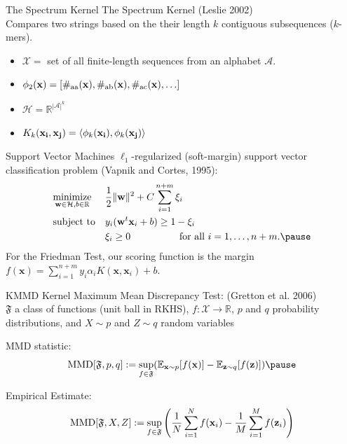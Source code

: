 \documentclass{beamer}
\providecommand{\norm}[1]{\lVert#1\rVert}
\begin{document}
\begin{frame}{The Spectrum Kernel}
  The Spectrum Kernel (Leslie 2002) \\ \pause
  Compares two strings based on the their length $k$ contiguous
  subsequences ($k$-mers). \pause
  \begin{itemize}
    \item $\mathcal{X} = $ set of all finite-length sequences from an alphabet $\mathcal{A}$. \pause
    \item $\phi_2({\bf x}) = [\#_{\text{aa}}({\bf x}), \#_{\text{ab}}({\bf x}), \#_{\text{ac}}({\bf x}), \ldots ]$ \pause
    \item $\mathcal{H} = \mathbb{R}^{|\mathcal{A}|^k}$ \pause
    \item $K_k({\bf x_i}, {\bf x_j}) = \langle \phi_k({\bf x_i}), \phi_k({\bf x_j}) \rangle$
  \end{itemize}
\end{frame}

\begin{frame}{Support Vector Machines}
$\ell_1$-regularized (soft-margin) support vector classification problem
(Vapnik and Cortes, 1995): \pause
\begin{equation*}
\begin{aligned}
& \underset{\mathbf{w} \in \mathcal{H}, b \in \mathbb{R}}{\text{minimize}}
& &\frac{1}{2}\norm{\mathbf{w}}^2+C\sum_{i=1}^{n+m} \xi_i \\
& \text{subject to}
& & y_i(\mathbf{w}^t \mathbf{x}_i + b) \geq 1 - \xi_i \\
&&& \xi_i \geq 0 \qquad \qquad \quad \text{for all } i=1,\ldots,n+m. \pause
\end{aligned}
\end{equation*}
For the Friedman Test, our scoring function is the margin
$f(\mathbf{x}) = \sum_{i=1}^{n+m} y_i \alpha_i K(\mathbf{x}, \mathbf{x}_i) + b$.
\end{frame}

\begin{frame}{KMMD}
  Kernel Maximum Mean Discrepancy Test: (Gretton et al. 2006) \\ \pause
  $\mathfrak{F}$ a class of functions (unit ball in RKHS), $f:\mathcal{X} \to \mathbb{R}$,
  $p$ and $q$ probability distributions, and $X \sim p$ and $Z \sim q$ random variables \\ \pause

  MMD statistic:
  \begin{equation*}
    \text{MMD}[\mathfrak{F},p,q] := \sup_{f\in
      \mathfrak{F}}(\mathbb{E}_{{\bf x} \sim p}[f({\bf x})] - \mathbb{E}_{{\bf z} \sim q}[f({\bf z})]) \pause
  \end{equation*}

  Empirical Estimate:
  \begin{equation*}
    \text{MMD}[\mathfrak{F},X,Z] := \sup_{f\in
      \mathfrak{F}}\left (\frac{1}{N}\sum_{i=1}^Nf({\bf x}_i) -
    \frac{1}{M}\sum_{i=1}^M f({\bf z}_i) \right )
  \end{equation*}
\end{frame}
\end{document}
